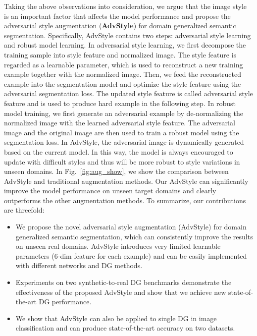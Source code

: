 \documentclass{article}
\begin{document}
Taking the above observations into consideration, we argue that the image style is an important factor that affects the model performance and propose the adversarial style augmentation (\textbf{AdvStyle}) for domain generalized semantic segmentation. Specifically, AdvStyle contains two steps: adversarial style learning and robust model learning. 
In adversarial style learning, we first decompose the training sample into style feature and normalized image. The style feature is regarded as a learnable parameter, which is used to reconstruct a new training example together with the normalized image.
Then, we feed the reconstructed example into the segmentation model and optimize the style feature using the adversarial segmentation loss. The updated style feature is called adversarial style feature and is used to produce hard example in the following step.
In robust model training, we first generate an adversarial example by de-normalizing the normalized image with the learned adversarial style feature. The adversarial image and the original image are then used to train a robust model using the segmentation loss. In AdvStyle, the adversarial image is dynamically generated based on the current model. In this way, the model is always encouraged to update with difficult styles and thus will be more robust to style variations in unseen domains. In Fig.~\ref{fig:aug_show}, we show the comparison between AdvStyle and traditional augmentation methods. Our AdvStyle can significantly improve the model performance on unseen target domains and clearly outperforms the other augmentation methods. To summarize, our contributions are threefold:
\begin{itemize}[leftmargin=.2in]
\item We propose the novel adversarial style augmentation (AdvStyle) for domain generalized semantic segmentation, which can consistently improve the results on unseen real domains. AdvStyle introduces very limited learnable parameters (6-dim feature for each example) and can be easily implemented with different networks and DG methods.
\item Experiments on two synthetic-to-real DG benchmarks demonstrate the effectiveness of the proposed AdvStyle and show that we achieve new state-of-the-art DG performance.
\item We show that AdvStyle can also be applied to single DG in image classification and can produce state-of-the-art accuracy on two datasets.
\end{itemize}
\end{document}
